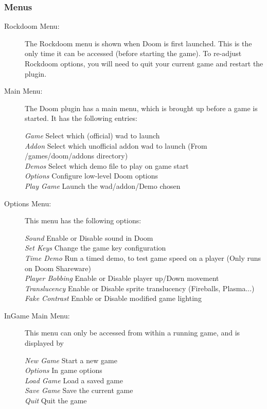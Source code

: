 \subsubsection{Menus}
\begin{description}
  \item[Rockdoom Menu: ] The Rockdoom menu is shown when Doom is first launched.  
This is the only time it can be accessed (before starting the game).  To re-adjust 
Rockdoom options, you will need to quit your current game and restart the plugin.
  \item[Main Menu: ]
  The Doom plugin has a main menu, which is brought up before a game is started. It 
  has the following entries:
  
  \emph{Game } Select which (official) wad to launch\\
  \emph{Addon } Select which unofficial addon wad to launch (From /games/doom/addons directory)\\
  \emph{Demos } Select which demo file to play on game start\\
  \emph{Options } Configure low-level Doom options\\
  \emph{Play Game } Launch the wad/addon/Demo chosen%
  
  \item[Options Menu: ]This menu has the following options:
  
  \emph{Sound } Enable or Disable sound in Doom\\
  \emph{Set Keys }  Change the game key configuration\\
  \emph{Time Demo } Run a timed demo, to test game speed on a player (Only runs on Doom Shareware)\\
  \emph{Player Bobbing } Enable or Disable player up/Down movement\\
  \emph{Translucency } Enable or Disable sprite translucency (Fireballs, Plasma...)\\
  \emph{Fake Contrast} Enable or Disable modified game lighting%

  \item[InGame Main Menu: ]This menu can only be accessed from within a running game, and is displayed by  

  \emph{New Game } Start a new game\\
  \emph{Options } In game options\\
  \emph{Load Game } Load a saved game\\
  \emph{Save Game } Save the current game\\
  \emph{Quit } Quit the game%


\end{description}
